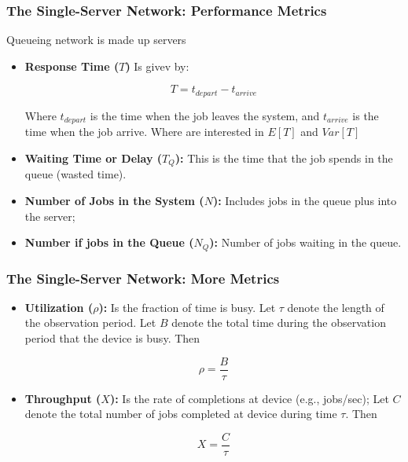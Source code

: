 \begin{frame}
    \frametitle{The Single-Server Network: Performance Metrics}

    Queueing network is made up servers

    \begin{itemize}
        \item \textbf{Response Time ($T$)} Is givev by:

        $$T = t_{depart} - t_{arrive}$$

        Where $t_{depart}$ is the time when the job leaves the system, and $t_{arrive}$ is the
        time when the job arrive. {\color{red}Where are interested in $E[T]$ and $Var[T]$}

        \item \textbf{Waiting Time or Delay ($T_Q$):} This is the time that the job spends in 
        the queue (wasted time).

        \item \textbf{Number of Jobs in the System ($N$):}  Includes jobs in the queue plus into 
        the server;

        \item \textbf{Number if jobs in the Queue ($N_Q$):} Number of jobs waiting in the queue.

    \end{itemize}

\end{frame}



\begin{frame}
    \frametitle{The Single-Server Network: More Metrics}

    \begin{itemize}
       
        
        \item \textbf{Utilization ($\rho$):} Is the fraction of time is busy. Let $\tau$ denote
        the length of the observation period. Let $B$ denote the total time
        during the observation period that the device {\color{red}is busy}. Then 

        $$\rho = \frac{B}{\tau}$$
      
        \item \textbf{Throughput ($X$):} Is the rate of completions at device (e.g., jobs/sec);
        Let $C$ denote the total number of jobs {\color{red}completed} at 
        device during time $\tau$. Then

        $$X = \frac{C}{\tau}$$


    \end{itemize}

\end{frame}



